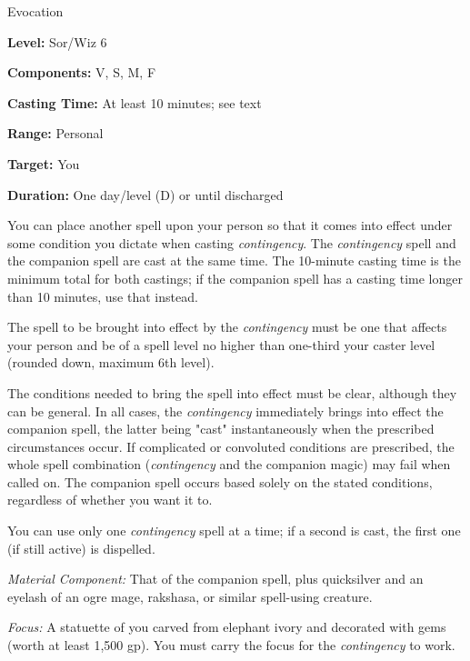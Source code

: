 
Evocation

\textbf{Level:} Sor/Wiz 6

\textbf{Components:} V, S, M, F

\textbf{Casting Time:} At least 10 minutes; see text

\textbf{Range:} Personal

\textbf{Target:} You

\textbf{Duration:} One day/level (D) or until discharged

You can place another spell upon your person so that it comes into effect under 
some condition you dictate when casting \textit{contingency}. The \textit{contingency 
}spell and the companion spell are cast at the same time. The 10-minute casting 
time is the minimum total for both castings; if the companion spell has a casting 
time longer than 10 minutes, use that instead.

The spell to be brought into effect by the \textit{contingency} must be one that 
affects your person and be of a spell level no higher than one-third your caster 
level (rounded down, maximum 6th level).

The conditions needed to bring the spell into effect must be clear, although they 
can be general. In all cases, the \textit{contingency} immediately brings into 
effect the companion spell, the latter being "cast" instantaneously when the 
prescribed circumstances occur. If complicated or convoluted conditions are prescribed, 
the whole spell combination (\textit{contingency} and the companion magic) may 
fail when called on. The companion spell occurs based solely on the stated conditions, 
regardless of whether you want it to.

You can use only one \textit{contingency} spell at a time; if a second is cast, 
the first one (if still active) is dispelled.

\textit{Material Component:} That of the companion spell, plus quicksilver and 
an eyelash of an ogre mage, rakshasa, or similar spell-using creature.

\textit{Focus:} A statuette of you carved from elephant ivory and decorated with 
gems (worth at least 1,500 gp). You must carry the focus for the \textit{contingency 
}to work.

